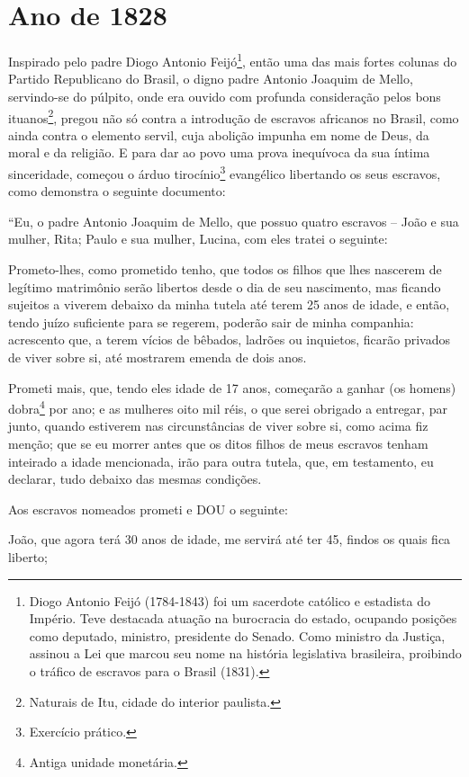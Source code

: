 \section{Ano de 1828}

Inspirado pelo padre Diogo Antonio Feijó\footnote{Diogo Antonio Feijó
  (1784-1843) foi um sacerdote católico e estadista do Império. Teve
  destacada atuação na burocracia do estado, ocupando posições como
  deputado, ministro, presidente do Senado. Como ministro da Justiça,
  assinou a Lei que marcou seu nome na história legislativa brasileira,
  proibindo o tráfico de escravos para o Brasil (1831).}, então uma das
mais fortes colunas do Partido Republicano do Brasil, o digno padre
Antonio Joaquim de Mello, servindo-se do púlpito, onde era ouvido com
profunda consideração pelos bons ituanos\footnote{Naturais de Itu,
  cidade do interior paulista.}, pregou não só contra a introdução de
escravos africanos no Brasil, como ainda contra o elemento servil, cuja
abolição impunha em nome de Deus, da moral e da religião. E para dar ao
povo uma prova inequívoca da sua íntima sinceridade, começou o árduo
tirocínio\footnote{Exercício prático.} evangélico libertando os seus
escravos, como demonstra o seguinte documento:

``Eu, o padre Antonio Joaquim de Mello, que possuo quatro escravos --
João e sua mulher, Rita; Paulo e sua mulher, Lucina, com eles tratei o
seguinte:

Prometo-lhes, como prometido tenho, que todos os filhos que lhes
nascerem de legítimo matrimônio serão libertos desde o dia de seu
nascimento, mas ficando sujeitos a viverem debaixo da minha tutela até
terem 25 anos de idade, e então, tendo juízo suficiente para se regerem,
poderão sair de minha companhia: acrescento que, a terem vícios de
bêbados, ladrões ou inquietos, ficarão privados de viver sobre si, até
mostrarem emenda de dois anos.

Prometi mais, que, tendo eles idade de 17 anos, começarão a ganhar (os
homens) dobra\footnote{Antiga unidade monetária.} por ano; e as
mulheres oito mil réis, o que serei obrigado a entregar, par junto,
quando estiverem nas circunstâncias de viver sobre si, como acima fiz
menção; que se eu morrer antes que os ditos filhos de meus escravos
tenham inteirado a idade mencionada, irão para outra tutela, que, em
testamento, eu declarar, tudo debaixo das mesmas condições.

Aos escravos nomeados prometi e DOU o seguinte:

João, que agora terá 30 anos de idade, me servirá até ter 45, findos os
quais fica liberto;

